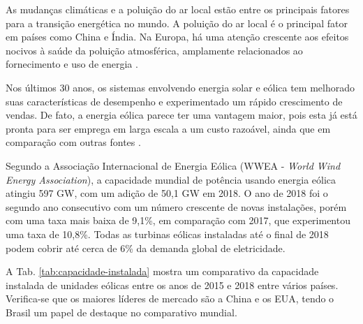 As mudanças climáticas e a poluição do ar local estão entre os principais fatores para a transição energética no mundo. 
A poluição do ar local é o principal fator em países como China e Índia. 
Na Europa, há uma atenção crescente aos efeitos nocivos à saúde da poluição atmosférica, amplamente relacionados ao fornecimento e uso de energia \cite{Gielen2019}.


Nos últimos 30 anos, os sistemas envolvendo energia solar e eólica tem melhorado suas características de desempenho e experimentado um rápido crescimento de vendas. 
De fato, a energia eólica parece ter uma vantagem maior, pois esta já está pronta para ser emprega em larga escala a um custo razoável, ainda que em comparação com outras fontes \cite{Kumar2016}.

Segundo a Associação Internacional de Energia Eólica (WWEA - \textit{World Wind Energy Association}), a capacidade mundial de potência usando energia eólica atingiu 597 GW, com um adição de 50,1 GW em 2018.
O ano de 2018 foi o segundo ano consecutivo com um número crescente de novas instalações, porém com uma taxa mais baixa de 9,1\%, em comparação com 2017, que experimentou uma taxa de 10,8\%.
Todas as turbinas eólicas instaladas até o final de 2018 podem cobrir até cerca de 6\% da demanda global de eletricidade.

A Tab. \ref{tab:capacidade-instalada} mostra um comparativo da capacidade instalada de unidades eólicas entre os anos de 2015 e 2018 entre vários países.
Verifica-se que os maiores líderes de mercado são a China e os EUA, tendo o Brasil um papel de destaque no comparativo mundial.

